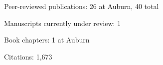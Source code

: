\begin{veryTightItemize}
    \item Peer-reviewed publications: 26 at Auburn, 40 total
    \item Manuscripts currently under review: 1
    \item Book chapters: 1 at Auburn
    \item Citations: 1,673
\end{veryTightItemize}
